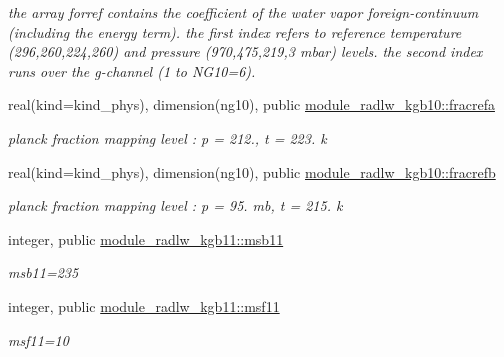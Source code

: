 \begin{DoxyCompactItemize}
\begin{DoxyCompactList}\small\item\em the array forref contains the coefficient of the water vapor foreign-\/continuum (including the energy term). the first index refers to reference temperature (296,260,224,260) and pressure (970,475,219,3 mbar) levels. the second index runs over the g-\/channel (1 to N\+G10=6). \end{DoxyCompactList}\item 
\mbox{\label{group__module__radlw__kgbnn_gaa8bbfdaf370e12ae26d2ee3c464bdbc2}} 
real(kind=kind\+\_\+phys), dimension(ng10), public \hyperlink{group__module__radlw__kgbnn_gaa8bbfdaf370e12ae26d2ee3c464bdbc2}{module\+\_\+radlw\+\_\+kgb10\+::fracrefa}
\begin{DoxyCompactList}\small\item\em planck fraction mapping level \+: p = 212., t = 223. k \end{DoxyCompactList}\item 
\mbox{\label{group__module__radlw__kgbnn_ga07d5bac00d30f1ab873a0542b28d7e83}} 
real(kind=kind\+\_\+phys), dimension(ng10), public \hyperlink{group__module__radlw__kgbnn_ga07d5bac00d30f1ab873a0542b28d7e83}{module\+\_\+radlw\+\_\+kgb10\+::fracrefb}
\begin{DoxyCompactList}\small\item\em planck fraction mapping level \+: p = 95. mb, t = 215. k \end{DoxyCompactList}\item 
\mbox{\label{group__module__radlw__kgbnn_gaa8630868015cb7e358107e6418e35276}} 
integer, public \hyperlink{group__module__radlw__kgbnn_gaa8630868015cb7e358107e6418e35276}{module\+\_\+radlw\+\_\+kgb11\+::msb11}
\begin{DoxyCompactList}\small\item\em msb11=235 \end{DoxyCompactList}\item 
\mbox{\label{group__module__radlw__kgbnn_ga7dcec9b9f19a3f5f13d443572d834628}} 
integer, public \hyperlink{group__module__radlw__kgbnn_ga7dcec9b9f19a3f5f13d443572d834628}{module\+\_\+radlw\+\_\+kgb11\+::msf11}
\begin{DoxyCompactList}\small\item\em msf11=10 \end{DoxyCompactList}\item 

\end{DoxyCompactItemize}
